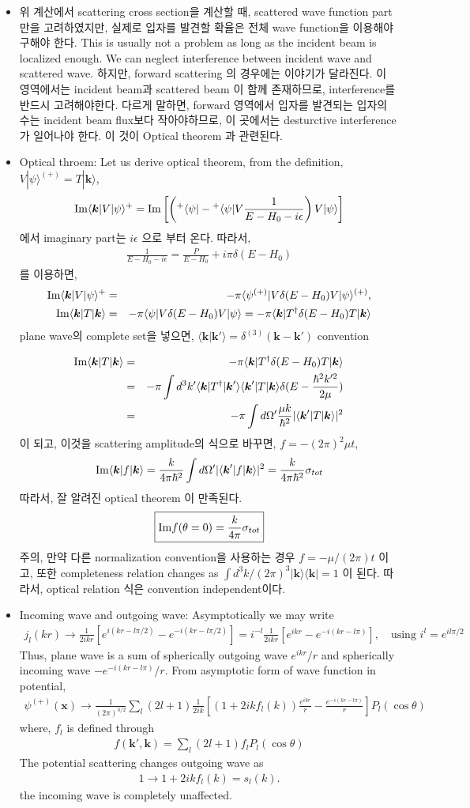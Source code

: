 \documentclass[10pt]{book}
\def\bm{\boldsymbol}
\newcommand{\bea}{\begin{eqnarray}}
\newcommand{\eea}{\end{eqnarray}}
\newcommand{\no}{\nonumber \\}
\def\vk{{\bm k}}
\def\vx{{\bm x}}
\def\la{\langle}
\def\ra{\rangle}
\begin{document}
\begin{itemize}
\item 위 계산에서 scattering cross section을 계산할 때, scattered wave function part만을 고려하였지만,
      실제로 입자를 발견할 확율은 전체 wave function을 이용해야 구해야 한다. 
      This is usually not a problem as long as the
      incident beam is localized enough. 
      We can neglect interference between incident wave and scattered wave. 하지만, 
      forward scattering 의 경우에는 이야기가 달라진다. 이 영역에서는 incident beam과 scattered beam
      이 함께 존재하므로, interference를 반드시 고려해야한다. 다르게 말하면, forward 영역에서 
      입자를 발견되는 입자의 수는 incident beam flux보다 작아야하므로, 이 곳에서는 desturctive 
      interference가 일어나야 한다. 이 것이 Optical theorem 과 관련된다.  
      
\item Optical throem: 
Let us derive optical theorem, from the definition,
$V|\psi\ra^{(+)}=T|\vk\ra$,
\bea
{\rm Im}\la \vk|V|\psi\ra^+={\rm Im}\left[
\left({}^+\la\psi|-{}^+\la\psi|V\frac{1}{E-H_0-i\epsilon}\right)V|\psi\ra
\right]
\eea
에서 imaginary part는 $i\epsilon$ 으로 부터 온다. 따라서,
\bea
\frac{1}{E-H_0-i\epsilon}=\frac{P}{E-H_0}+i\pi\delta(E-H_0)
\eea 
를 이용하면,
\bea
{\rm Im}\la \vk|V|\psi\ra^+
&=&-\pi{}\la\psi^{(+)}|V\delta(E-H_0)V|\psi\ra^{(+)},\no
{\rm Im}\la \vk|T|\vk\ra
&=&-\pi\la\psi|V\delta(E-H_0)V|\psi\ra
   =-\pi\la\vk|T^\dagger\delta(E-H_0)T|\vk\ra
\eea
plane wave의 complete set을 넣으면,
$\la \vk|\vk'\ra=\delta^{(3)}(\vk-\vk')$ convention

\bea
{\rm Im}\la \vk|T|\vk\ra
&=&-\pi\la\vk|T^\dagger\delta(E-H_0)T|\vk\ra\no
&=&-\pi\int d^3k'\la \vk|T^\dagger|\vk'\ra 
                     \la \vk'|T|\vk\ra
                  \delta(E-\frac{\hbar^2 k'^2}{2\mu})\no 
 &=&-\pi\int d\Omega' 
    \frac{\mu k}{\hbar^2}|\la \vk'|T|\vk\ra|^2
\eea
이 되고, 이것을 scattering amplitude의 식으로 바꾸면,
$f=-(2\pi)^2\mu t$,
\bea
{\rm Im}\la \vk|f|\vk\ra
=\frac{k}{4\pi\hbar^2}\int d\Omega'
 |\la \vk'|f|\vk\ra|^2 
= \frac{k}{4\pi\hbar^2} \sigma_{tot}
\eea
따라서, 잘 알려진 optical theorem 이 만족된다.
\bea
\boxed{
{\rm Im}f(\theta=0)=\frac{k}{4\pi}\sigma_{tot}}
\eea
주의, 만약 다른 normalization convention을 사용하는 경우
$f=-\mu/(2\pi) t$ 이고, 또한 completeness relation changes
as $\int d^3 k/(2\pi)^3 |\vk\ra\la \vk|=1$ 이 된다.
따라서, optical relation 식은 convention independent이다.

\item Incoming wave and outgoing wave:
Asymptotically we may write
\bea 
j_l(kr)\to \frac{1}{2ikr}[ e^{i(kr-l\pi/2)}-e^{-i(kr-l\pi/2)}]   
          = i^{-l}\frac{1}{2ikr}[ e^{ikr}-e^{-i(kr-l\pi)} ], \quad \mbox{using } i^l=e^{i l\pi /2}
\eea 
Thus, plane wave is a sum of spherically outgoing wave $e^{ikr}/r$
and spherically incoming wave $-e^{-i(kr-l\pi)}/r$. 
From asymptotic form of wave function in potential,
\bea 
\psi^{(+)}(\vx)
\to \frac{1}{(2\pi)^{3/2}}\sum_l (2l+1) \frac{1}{2ik}\left[ 
       \left(1+2ik f_l(k) \right) \frac{e^{ikr}}{r}- \frac{e^{-i(kr-l\pi) }}{r}\right]
       P_l(\cos\theta)
\eea 
where, $f_l$ is defined through
\bea 
f(\vk',\vk)=\sum_l (2l+1) f_l P_l(\cos\theta )
\eea 
The potential scattering changes
outgoing wave as
\bea
1\to 1+2ik f_l(k)=s_l(k).
\eea 
the incoming wave is completely unaffected.


\end{itemize}
\end{document}

